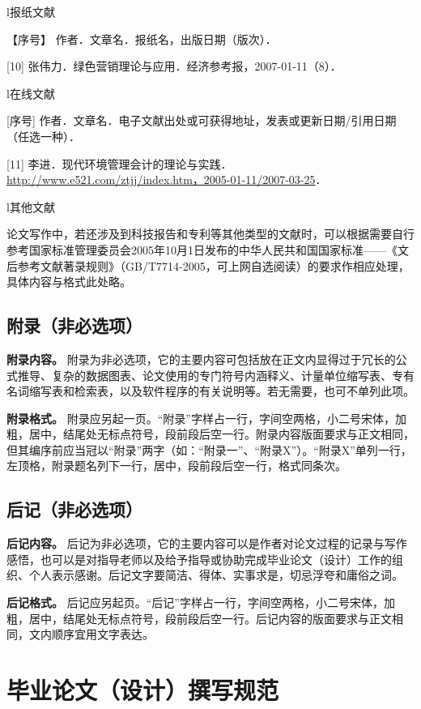 \documentclass[doublesided]{Style/ucasthesis}%
\begin{document}
l报纸文献

【序号】 作者．文章名．报纸名，出版日期（版次）．

{[}10{]} 张伟力．绿色营销理论与应用．经济参考报，2007-01-11（8）．

l在线文献

{[}序号{]} 作者．文章名．电子文献出处或可获得地址，发表或更新日期/引用日期（任选一种）．

{[}11{]} 李进．现代环境管理会计的理论与实践．\url{http://www.e521.com/ztjj/index.htm，2005-01-11/2007-03-25}．

l其他文献

论文写作中，若还涉及到科技报告和专利等其他类型的文献时，可以根据需要自行参考国家标准管理委员会2005年10月1日发布的中华人民共和国国家标准------《文后参考文献著录规则》（GB/T7714-2005，可上网自选阅读）的要求作相应处理，具体内容与格式此处略。

\hypertarget{section-23}{%
\subsection{附录（非必选项）}\label{section-23}}

\textbf{附录内容。} 附录为非必选项，它的主要内容可包括放在正文内显得过于冗长的公式推导、复杂的数据图表、论文使用的专门符号内涵释义、计量单位缩写表、专有名词缩写表和检索表，以及软件程序的有关说明等。若无需要，也可不单列此项。

\textbf{附录格式。} 附录应另起一页。``附录''字样占一行，字间空两格，小二号宋体，加粗，居中，结尾处无标点符号，段前段后空一行。附录内容版面要求与正文相同，但其编序前应当冠以``附录''两字（如：``附录一''、``附录X''）。``附录X''单列一行，左顶格，附录题名列下一行，居中，段前段后空一行，格式同条次。

\hypertarget{section-24}{%
\subsection{后记（非必选项）}\label{section-24}}

\textbf{后记内容。} 后记为非必选项，它的主要内容可以是作者对论文过程的记录与写作感悟，也可以是对指导老师以及给予指导或协助完成毕业论文（设计）工作的组织、个人表示感谢。后记文字要简洁、得体、实事求是，切忌浮夸和庸俗之词。

\textbf{后记格式。} 后记应另起页。``后记''字样占一行，字间空两格，小二号宋体，加粗，居中，结尾处无标点符号，段前段后空一行。后记内容的版面要求与正文相同，文内顺序宜用文字表达。

\hypertarget{section-25}{%
\section{毕业论文（设计）撰写规范}\label{section-25}}
\end{document}
